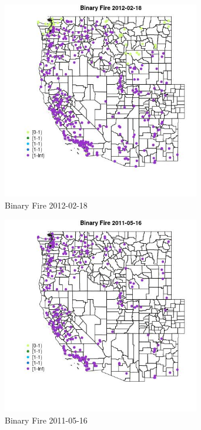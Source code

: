 \begin{figure} 
\centering  
\includegraphics[width=0.77\textwidth]{Code_Outputs/Report_ML_input_PM25_Step4_part_f_de_duplicated_aveswNAs_MapObsBinary_Fire2012-02-18.jpg} 
\caption{\label{fig:Report_ML_input_PM25_Step4_part_f_de_duplicated_aveswNAsMapObsBinary_Fire2012-02-18}Binary Fire 2012-02-18} 
\end{figure} 
 

\begin{figure} 
\centering  
\includegraphics[width=0.77\textwidth]{Code_Outputs/Report_ML_input_PM25_Step4_part_f_de_duplicated_aveswNAs_MapObsBinary_Fire2011-05-16.jpg} 
\caption{\label{fig:Report_ML_input_PM25_Step4_part_f_de_duplicated_aveswNAsMapObsBinary_Fire2011-05-16}Binary Fire 2011-05-16} 
\end{figure} 
 

